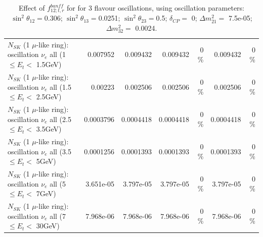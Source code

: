 \begin{table}
\begin{tabular}{| l | r | r | r  r | r  r |}
$N_{SK}$ (1 $\mu$-like ring): oscillation $\nu_{e}$ all (1 $\leq E_{t} <$ 1.5GeV) &        0.007952 &        0.009432 &        0.009432 &        0 \%  &        0.009432 &        0 \%  \\ 
$N_{SK}$ (1 $\mu$-like ring): oscillation $\nu_{e}$ all (1.5 $\leq E_{t} <$ 2.5GeV) &         0.00223 &        0.002506 &        0.002506 &        0 \%  &        0.002506 &        0 \%  \\ 
$N_{SK}$ (1 $\mu$-like ring): oscillation $\nu_{e}$ all (2.5 $\leq E_{t} <$ 3.5GeV) &       0.0003796 &       0.0004418 &       0.0004418 &        0 \%  &       0.0004418 &        0 \%  \\ 
$N_{SK}$ (1 $\mu$-like ring): oscillation $\nu_{e}$ all (3.5 $\leq E_{t} <$ 5GeV) &       0.0001256 &       0.0001393 &       0.0001393 &        0 \%  &       0.0001393 &        0 \%  \\ 
 $N_{SK}$ (1 $\mu$-like ring): oscillation $\nu_{e}$ all (5 $\leq E_{t} <$ 7GeV) &       3.651e-05 &       3.797e-05 &       3.797e-05 &        0 \%  &       3.797e-05 &        0 \%  \\ 
$N_{SK}$ (1 $\mu$-like ring): oscillation $\nu_{e}$ all (7 $\leq E_{t} <$ 30GeV) &       7.968e-06 &       7.968e-06 &       7.968e-06 &        0 \%  &       7.968e-06 &        0 \%  \\ 
\hline
\hline
\end{tabular}
\caption{ Effect of $f_{12; t, r}^{banff}$ for for 3 flavour oscillations, using oscillation parameters:  $\sin^2\theta_{12} = $0.306; $\sin^2\theta_{13} = $0.0251; $\sin^2\theta_{23} = $0.5; $\delta_{CP} = $        0; $\Delta m^2_{21} = $    7.5e-05; $\Delta m^2_{32} = $    0.0024. }
\label{tab:num_banff_12_1RmuT_3f_osc_t13:0.0251}
\end{table}
\clearpage
